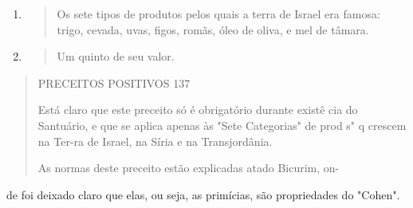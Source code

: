 \begin{enumerate}
\def\labelenumi{\arabic{enumi}.}
\setcounter{enumi}{165}
\item
  \begin{quote}
  Os sete tipos de produtos pelos quais a terra de Israel era famosa:
  trigo, cevada, uvas, figos, romãs, óleo de oliva, e mel de tâmara.
  \end{quote}
\item
  \begin{quote}
  Um quinto de seu valor.
  \end{quote}
\end{enumerate}

\begin{quote}
PRECEITOS POSITIVOS 137

Está claro que este preceito só é obrigatório durante existê cia do
Santuário, e que se aplica apenas às "Sete Categorias" de prod s" q
crescem na Ter-ra de Israel, na Síria e na Transjordânia.

As normas deste preceito estão explicadas atado Bicurim, on-
\end{quote}

de foi deixado claro que elas, ou seja, as primícias, são propriedades
do "Cohen".

